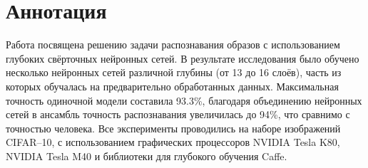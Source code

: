 \section*{Аннотация}
Работа посвящена решению задачи распознавания образов с использованием глубоких свёрточных 
нейронных сетей. В результате исследования было обучено несколько нейронных сетей различной глубины 
(от 13 до 16 слоёв), часть из которых обучалась на предварительно обработанных данных. Максимальная 
точность одиночной модели составила 93.3\%, благодаря объединению нейронных сетей в ансамбль 
точность распознавания увеличилась до 94\%, что сравнимо с точностью человека. Все эксперименты 
проводились на наборе изображений CIFAR--10, с использованием графических процессоров NVIDIA Tesla 
K80, NVIDIA Tesla M40 и библиотеки для глубокого обучения Caffe.